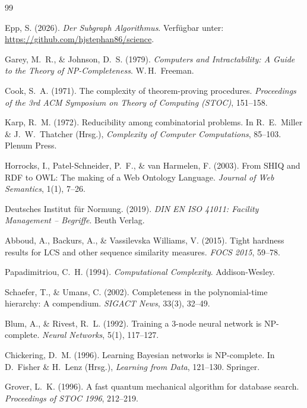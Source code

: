 ﻿\documentclass[a4paper,12pt]{article}
\theoremstyle{definition}
\begin{document}
\begin{thebibliography}{99}

    Epp, S. (2026).
    \textit{Der Subgraph Algorithmus}.
    Verfügbar unter: \url{https://github.com/hjstephan86/science}.

    Garey, M.\ R., \& Johnson, D.\ S. (1979).
    \textit{Computers and Intractability: A Guide to the Theory of NP-Completeness}.
    W.\,H.\ Freeman.

    Cook, S.\ A. (1971).
    The complexity of theorem-proving procedures.
    \textit{Proceedings of the 3rd ACM Symposium on Theory of Computing (STOC)},
    151--158.

    Karp, R.\ M. (1972).
    Reducibility among combinatorial problems.
    In R.\ E.\ Miller \& J.\ W.\ Thatcher (Hrsg.),
    \textit{Complexity of Computer Computations}, 85--103.
    Plenum Press.

    Horrocks, I., Patel-Schneider, P.\ F., \& van Harmelen, F. (2003).
    From \textsc{SHIQ} and RDF to OWL: The making of a Web Ontology Language.
    \textit{Journal of Web Semantics}, 1(1), 7--26.

    Deutsches Institut für Normung. (2019).
    \textit{DIN EN ISO 41011: Facility Management -- Begriffe}.
    Beuth Verlag.

    Abboud, A., Backurs, A., \& Vassilevska Williams, V. (2015).
    Tight hardness results for LCS and other sequence similarity measures.
    \textit{FOCS 2015}, 59--78.

    Papadimitriou, C.\ H. (1994).
    \textit{Computational Complexity}.
    Addison-Wesley.

    Schaefer, T., \& Umans, C. (2002).
    Completeness in the polynomial-time hierarchy: A compendium.
    \textit{SIGACT News}, 33(3), 32--49.

    Blum, A., \& Rivest, R.\ L. (1992).
    Training a 3-node neural network is NP-complete.
    \textit{Neural Networks}, 5(1), 117--127.

    Chickering, D.\ M. (1996).
    Learning Bayesian networks is NP-complete.
    In D.\ Fisher \& H.\ Lenz (Hrsg.),
    \textit{Learning from Data}, 121--130.
    Springer.

    Grover, L.\ K. (1996).
    A fast quantum mechanical algorithm for database search.
    \textit{Proceedings of STOC 1996}, 212--219.


\end{thebibliography}
\end{document}
